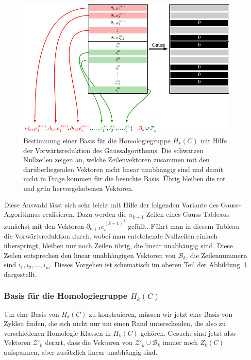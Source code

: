 \begin{figure}
\centering
\includegraphics{chapters/95-homologie/images/gausshomobasis.pdf}
\caption{Bestimmung einer Basis für die Homologiegruppe $H_k(C)$ mit
Hilfe der Vorwärtsreduktion des Gaussalgorithmus.
Die schwarzen Nullzeilen zeigen an, welche Zeilenvektoren zusammen mit
den darüberliegenden Vektoren nicht linear unabhängig sind und damit nicht
in Frage kommen für die besuchte Basis.
Übrig bleiben die {\color{red}rot} und {\color{darkgreen}grün} hervorgehobenen
Vektoren.
\label{buch:homologie:fig:gausshomobasis}}
\end{figure}

Diese Auswahl lässt sich sehr leicht mit Hilfe der folgenden
Variante des Gauss-Algorithmus realisieren.
Dazu werden die $n_{k+1}$ Zeilen eines Gauss-Tableaus zunächst mit den Vektoren
$\partial_{k+1}{e_i^{(k+1)}}^t$ gefüllt.
Führt man in diesem Tableau die Vorwärtsreduktion durch, wobei man
entstehende Nullzeilen einfach überspringt, bleiben nur noch Zeilen
übrig, die linear unabhängig sind.
Diese Zeilen entsprechen den linear unabhängigen Vektoren von $\mathcal{B}_k$,
die Zeilennummern sind $i_1,i_2,\dots,i_m$.
Dieses Vorgehen ist schematisch im oberen Teil der
Abbildung~\ref{buch:homologie:fig:gausshomobasis} dargestellt.

\subsubsection{Basis für die Homologiegruppe $H_k(C)$}
Um eine Basis von $H_k(C)$ zu konstruieren, müssen wir jetzt eine
Basis von Zyklen finden, die sich nicht nur um einen Rand unterscheiden,
die also zu verschiedenen Homologie-Klassen in $H_k(C)$ gehören.
Gesucht sind jetzt also Vektoren $\mathcal{Z}'_k$ derart, dass 
die Vektoren von $\mathcal{Z}'_k\cup\mathcal{B}_k$ immer noch $Z_k(C)$
aufspannen, aber zusätzlich linear unabhängig sind.

